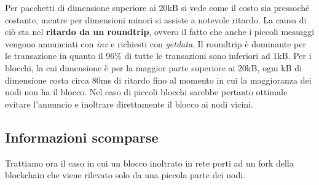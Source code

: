 Per pacchetti di dimensione superiore ai 20kB si vede come il costo sia pressoché costante, mentre per dimensioni minori si assiste a notevole ritardo. La causa di ciò sta nel \textbf{ritardo da un roundtrip}, ovvero il fatto che anche i piccoli messaggi vengono annunciati con \emph{inv} e richiesti con \emph{getdata}. Il roundtrip è dominante per le transazione in quanto il 96\% di tutte le transazioni sono inferiori ad 1kB. Per i blocchi, la cui dimensione è per la maggior parte superiore ai 20kB, ogni kB di dimensione costa circa 80ms di ritardo fino al momento in cui la maggioranza dei nodi non ha il blocco. %
Nel caso di piccoli blocchi sarebbe pertanto ottimale evitare l'annuncio e inoltrare direttamente il blocco ai nodi vicini.

\subsection{Informazioni scomparse}\label{informazioni-scomparse}

Trattiamo ora il caso in cui un blocco inoltrato in rete porti ad un fork della blockchain che viene rilevato solo da una piccola parte dei nodi.


